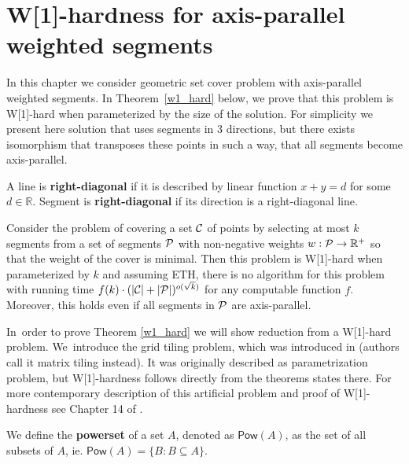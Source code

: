 \chapter{W[1]-hardness for axis-parallel weighted segments}
\label{chapter:w1_hard}

In this chapter we consider geometric set cover problem with 
axis-parallel weighted segments.
In Theorem~\ref{w1_hard} below, we prove that this problem is 
W[1]-hard when parameterized by the size of the solution.
For simplicity we present here solution that uses segments in
3 directions, but there exists isomorphism that transposes
these points in such a way, that all segments become axis-parallel.

\begin{defi}
	A line is \textbf{right-diagonal} if it is
	described by linear function $x + y = d$ for some $d \in \mathbb{R}$.
	Segment is \textbf{right-diagonal} if its
	direction is a right-diagonal line.
\end{defi}

\begin{tw}
\label{w1_hard}
	Consider the problem of covering a set $\mathcal{C}$ of points
	by selecting at most $k$ segments
	from a set of segments $\mathcal{P}$ 
	with non-negative weights $w : \mathcal{P} \rightarrow \mathbb{R^+}$
	so that the weight of the cover is minimal.
	Then this problem is W[1]-hard when parameterized by $k$ and
	assuming ETH, there is no algorithm for this
	problem with running time
	$f(k)\cdot(|\mathcal{C}| + |\mathcal{P}|)^{o(\sqrt{k})}$
	for any computable function $f$.
	Moreover, this holds even if all segments in $\mathcal{P}$
	are axis-parallel.
\end{tw}

In~order to prove Theorem \ref{w1_hard}
we will show reduction from a W[1]-hard problem.
We~introduce the grid tiling problem,
which was introduced in \cite{marx_grid_tiling}
(authors call it matrix tiling instead).
It was originally described as parametrization problem,
but W[1]-hardness follows directly from the theorems states there.
For more contemporary description of this artificial problem
and proof of W[1]-hardness see Chapter 14 of \cite{platypus}.

\newcommand{\pow}{\mathsf{Pow}}

\begin{defi}
We define the \textbf{powerset} of a set $A$, denoted as $\pow(A)$,
as the set of all subsets of $A$, ie. $\pow(A) = \{B : B \subseteq A\}$.
\end{defi}

